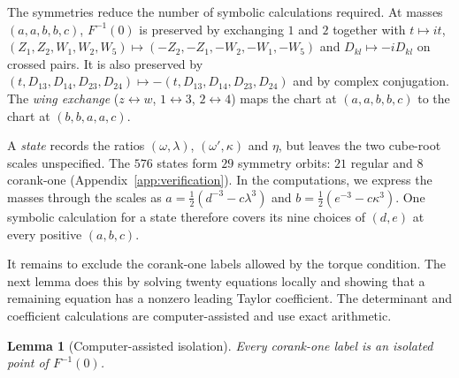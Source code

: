 \documentclass[Threeside,11pt]{article}
\newtheorem{lemma}[theorem]{Lemma}
\theoremstyle{definition}
\theoremstyle{remark}
\numberwithin{equation}{section}
\theoremstyle{remark}
\begin{document}
{
The symmetries reduce the number of symbolic calculations required.
At masses $(a,a,b,b,c)$, $F^{-1}(0)$ is preserved by exchanging $1$ and $2$
together with $t\mapsto it$,
$(Z_1,Z_2,W_1,W_2,W_5)\mapsto(-Z_2,-Z_1,-W_2,-W_1,-W_5)$ and
$D_{kl}\mapsto-iD_{kl}$ on crossed pairs.  It is also preserved by
$(t,D_{13},D_{14},D_{23},D_{24})\mapsto-(t,D_{13},D_{14},D_{23},D_{24})$
and by complex conjugation.  The \emph{wing exchange}
($z\leftrightarrow w$, $1\leftrightarrow3$, $2\leftrightarrow4$) maps the chart
at $(a,a,b,b,c)$ to the chart at $(b,b,a,a,c)$.

A \emph{state} records the ratios $(\omega,\lambda)$, $(\omega',\kappa)$ and $\eta$,
but leaves the two cube-root scales unspecified.  The $576$ states form
$29$ symmetry orbits: $21$ regular and $8$ corank-one
(Appendix~\ref{app:verification}).
In the computations, we express the masses through the scales as
$a=\frac12(d^{-3}-c\lambda^3)$ and $b=\frac12(e^{-3}-c\kappa^3)$.
One symbolic calculation for a state therefore covers its nine choices
of $(d,e)$ at every positive $(a,b,c)$.
}



{
It remains to exclude the corank-one labels allowed by the torque
condition.  The next lemma does this by solving twenty equations locally
and showing that a remaining equation has a nonzero leading Taylor
coefficient.  The determinant and coefficient calculations are
computer-assisted and use exact arithmetic.
}

\begin{lemma}[Computer-assisted isolation]\label{d6-lem-corank}
Every corank-one label is an isolated point of $F^{-1}(0)$.
\end{lemma}
\end{document}
